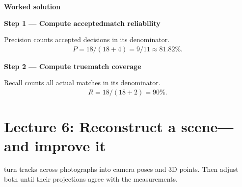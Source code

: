 \documentclass[letterpaper,11pt,english,openany,oneside]{jupyterBook}
\begin{document}
\par\medskip
\textbf{Worked solution}\par\smallskip

\par\medskip{}
{\color{QuizStepRed}\bfseries Step 1 — Compute accepted\sphinxhyphen{}match reliability}\par\smallskip

\sphinxAtStartPar
{} Precision counts accepted decisions in its denominator.
{\color{QuizMathBlue} \begin{equation*}
\begin{split}P=18/(18+4)=9/11\approx81.82\%.\end{split}
\end{equation*}}
\par

\par\medskip{}
{\color{QuizStepRed}\bfseries Step 2 — Compute true\sphinxhyphen{}match coverage}\par\smallskip

\sphinxAtStartPar
{} Recall counts all actual matches in its denominator.
{\color{QuizMathBlue} \begin{equation*}
\begin{split}R=18/(18+2)=90\%.\end{split}
\end{equation*}}
\par

\par\medskip

\sphinxstepscope


\chapter{Lecture 6: Reconstruct a scene—and improve it}
\label{\detokenize{lectures/lecture06/index:lecture-6-reconstruct-a-sceneand-improve-it}}\label{\detokenize{lectures/lecture06/index:lecture06}}\label{\detokenize{lectures/lecture06/index::doc}}
\sphinxAtStartPar
{} turn tracks across photographs into camera poses and 3D points. Then adjust both until their projections agree with the measurements.
\end{document}
